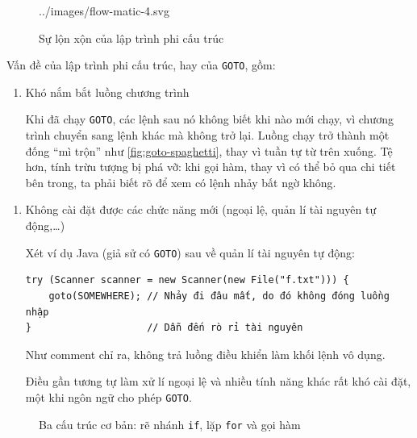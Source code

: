 \documentclass[../../thesis]{subfiles}
\begin{document}
\begin{figure}
    \centering
    
        {../images/flow-matic-4.svg}
    \caption{Sự lộn xộn của lập trình phi cấu trúc \cite{NJS_SC}}
    \label{fig:goto-spaghetti}
\end{figure}

Vấn đề của lập trình phi cấu trúc, hay của \texttt{GOTO}, gồm:

\begin{enumerate}
    \item
        Khó nắm bắt luồng chương trình

        Khi đã chạy \texttt{GOTO}, các lệnh sau nó không biết khi nào mới chạy,
        vì chương trình chuyển sang lệnh khác mà không trở lại. Luồng chạy trở
        thành một đống ``mì trộn'' như \autoref{fig:goto-spaghetti}, thay vì
        tuần tự từ trên xuống. Tệ hơn, tính trừu tượng bị phá vỡ: khi gọi hàm,
        thay vì có thể bỏ qua chi tiết bên trong, ta phải biết rõ để xem có lệnh
        nhảy bất ngờ không.
\end{enumerate}

\begin{enumerate}[resume, before = \vspace*{-\dimexpr\topsep+\partopsep\relax}]
    \item
        Không cài đặt được các chức năng mới (ngoại lệ, quản lí tài nguyên tự
        động,\ldots)

        Xét ví dụ Java (giả sử có \texttt{GOTO}) sau về quản lí tài nguyên tự
        động:

        \begin{verbatim}
try (Scanner scanner = new Scanner(new File("f.txt"))) {
    goto(SOMEWHERE); // Nhảy đi đâu mất, do đó không đóng luồng nhập
}                    // Dẫn đến rò rỉ tài nguyên
        \end{verbatim}

        Như comment chỉ ra, không trả luồng điều khiển làm khối lệnh vô dụng.

        Điều gần tương tự làm xử lí ngoại lệ và nhiều tính năng khác rất khó cài
        đặt, một khi ngôn ngữ cho phép \texttt{GOTO}.
\end{enumerate}

\begin{figure}
    \centering
    \vspace*{-7mm}
    
    \vspace*{-10mm}
    \caption{Ba cấu trúc cơ bản: rẽ nhánh \texttt{if}, lặp \texttt{for} và gọi
        hàm \cite{NJS_SC}}
    \label{fig:3-basic-construct}
\end{figure}
\end{document}
